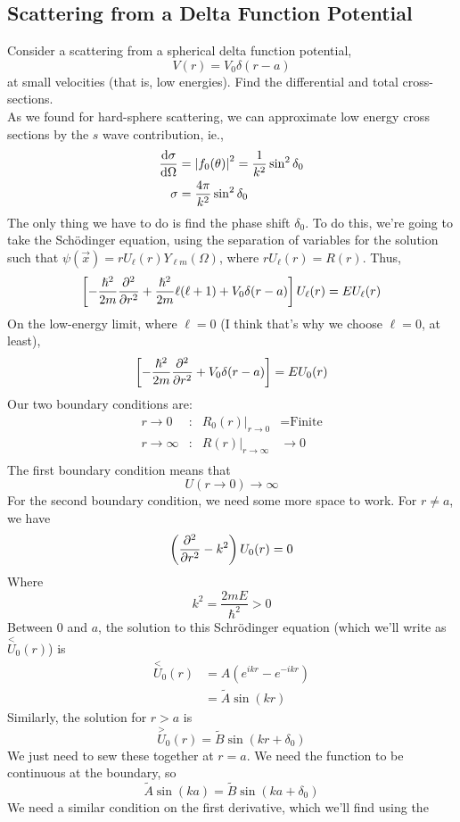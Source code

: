 \documentclass[a4paper]{article}
\begin{document}
\subsection{Scattering from a Delta Function Potential}
Consider a scattering from a spherical delta function potential,
\[
	V(r) = V_0\delta(r-a)
\]
at small velocities (that is, low energies). Find the differential and total
cross-sections.\\
As we found for hard-sphere scattering, we can approximate low energy cross
sections by the $s$ wave contribution, ie.,
\begin{align*}
	\frac{\mathrm{d} \sigma}{\mathrm{d} \Omega} &= \left\lvert f_0(\theta)\right\rvert^2 = \frac{1}{k^2}\sin^2
		\delta_0\\
	\sigma &= \frac{4\pi}{k^2}\sin^2\delta_0
\end{align*}
The only thing we have to do is find the phase shift $\delta_0$. To do this,
we're going to take the Sch\"odinger equation, using the separation of
variables for the solution such that
$\psi(\vec{x}) = r U_\ell(r)Y_{\ell m}(\Omega)$, where $r U_\ell(r) = R(r)$.
Thus,
\[
	\left[ -\frac{\hslash^2}{2m}\pd[2]{r} +
		\frac{\hslash^2}{2m}\ell(\ell+1) + V_0\delta(r-a)
	\right]U_\ell(r) = EU_\ell(r)
\]
On the low-energy limit, where $\ell=0$ (I think that's why we choose $\ell=0$,
at least),
\[
	\left[-\frac{\hslash^2}{2m}\pd[2]{r} + V_0\delta(r-a)\right] = EU_0(r)
\]
Our two boundary conditions are:
\begin{align*}
	r \to 0 &: & \left. R_0(r)\right|_{r\to0} &= \text{Finite}\\
	r \to \infty &: & R(r)|_{r\to\infty} &\to 0\\
\end{align*}
The first boundary condition means that
\[
	U(r\to 0) \to \infty
\]
For the second boundary condition, we need some more space to work. For
$r \neq a$, we have
\[
	\left(\pd[2]{r}-k^2\right)U_0(r) = 0
\]
Where
\[
	k^2 = \frac{2mE}{\hslash^2} > 0
\]
Between 0 and $a$, the solution to this Schr\"odinger equation (which we'll
write as $\overset{<}{U}_0(r)$) is
\begin{align*}
	\overset{<}{U}_0(r) &= A\left(e^{ikr}-e^{-ikr}\right)\\
	&= \tilde{A}\sin(kr)
\end{align*}
Similarly, the solution for $r>a$ is
\[
	\overset{>}{U}_0(r) = \tilde{B}\sin(kr+\delta_0)
\]
We just need to sew these together at $r=a$. We need the function to be
continuous at the boundary, so
\[
	\tilde{A}\sin(ka) = \tilde{B}\sin(ka+\delta_0)
\]
We need a similar condition on the first derivative, which we'll find using the
\end{document}
